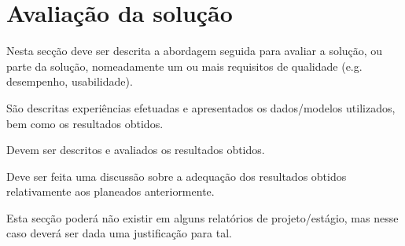 \section{Avaliação da solução} 

Nesta secção deve ser descrita a abordagem seguida para avaliar a solução, ou parte da solução, nomeadamente um ou mais requisitos de qualidade (e.g. desempenho, usabilidade). 

São descritas experiências efetuadas e apresentados os dados/modelos utilizados, bem como os resultados obtidos. 

Devem ser descritos e avaliados os resultados obtidos. 

Deve ser feita uma discussão sobre a adequação dos resultados obtidos relativamente aos planeados anteriormente. 

Esta secção poderá não existir em alguns relatórios de projeto/estágio, mas nesse caso deverá ser dada uma justificação para tal. 
